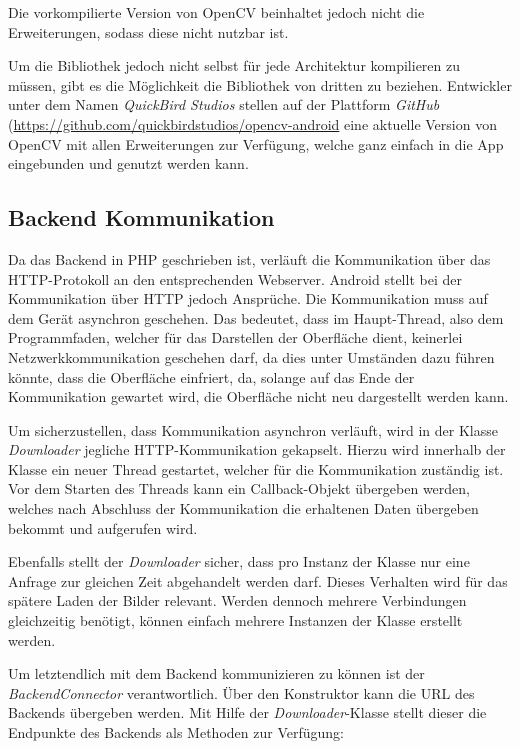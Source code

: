 Die vorkompilierte Version von OpenCV beinhaltet jedoch nicht die Erweiterungen, sodass diese nicht nutzbar ist.

Um die Bibliothek jedoch nicht selbst für jede Architektur kompilieren zu müssen, gibt es die Möglichkeit die Bibliothek von dritten zu beziehen.
Entwickler unter dem Namen {\em QuickBird Studios} stellen auf der Plattform {\em GitHub} (\url{https://github.com/quickbirdstudios/opencv-android} eine aktuelle Version von OpenCV mit allen Erweiterungen zur Verfügung, welche ganz einfach in die App eingebunden und genutzt werden kann.

\subsection{Backend Kommunikation}
\label{sec:BackendCom}
Da das Backend in PHP geschrieben ist, verläuft die Kommunikation über das HTTP-Protokoll an den entsprechenden Webserver.
Android stellt bei der Kommunikation über HTTP jedoch Ansprüche. Die Kommunikation muss auf dem Gerät asynchron geschehen. Das bedeutet, dass im Haupt-Thread,
also dem Programmfaden, welcher für das Darstellen der Oberfläche dient, keinerlei Netzwerkkommunikation geschehen darf, da dies unter Umständen dazu führen könnte, dass die Oberfläche einfriert, da, solange auf das Ende der Kommunikation gewartet wird, die Oberfläche nicht neu dargestellt werden kann.

Um sicherzustellen, dass Kommunikation asynchron verläuft, wird in der Klasse {\em Downloader} jegliche HTTP-Kommunikation gekapselt.
Hierzu wird innerhalb der Klasse ein neuer Thread gestartet, welcher für die Kommunikation zuständig ist. Vor dem Starten des Threads kann ein Callback-Objekt übergeben werden, welches nach Abschluss der Kommunikation die erhaltenen Daten übergeben bekommt und aufgerufen wird.

Ebenfalls stellt der {\em Downloader} sicher, dass pro Instanz der Klasse nur eine Anfrage zur gleichen Zeit abgehandelt werden darf. Dieses Verhalten wird für das spätere Laden der Bilder relevant.
Werden dennoch mehrere Verbindungen gleichzeitig benötigt, können einfach mehrere Instanzen der Klasse erstellt werden.

Um letztendlich mit dem Backend kommunizieren zu können ist der {\em BackendConnector} verantwortlich.
Über den Konstruktor kann die URL des Backends übergeben werden.
Mit Hilfe der {\em Downloader}-Klasse stellt dieser die Endpunkte des Backends als Methoden zur Verfügung:

